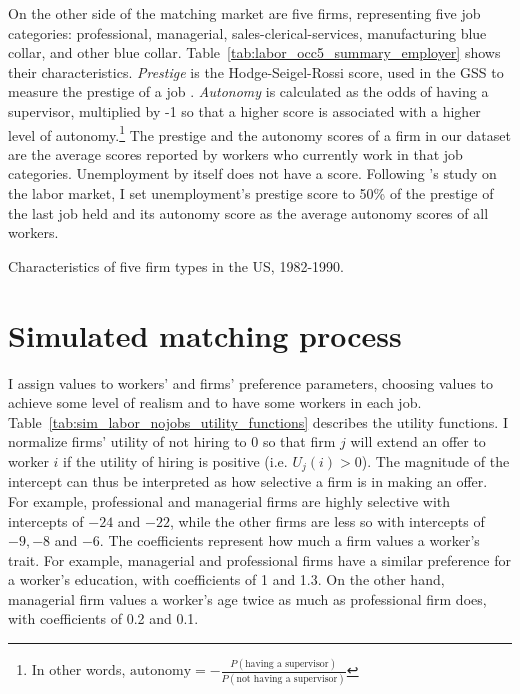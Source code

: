On the other side of the matching market are five firms, representing five job
categories: professional, managerial, sales-clerical-services, manufacturing
blue collar, and other blue collar. Table~\ref{tab:labor_occ5_summary_employer}
shows their characteristics. \textit{Prestige} is the Hodge-Seigel-Rossi score,
used in the GSS to measure the prestige of a job \citep{Hodge1964, NORC2014}.
\textit{Autonomy} is calculated as the odds of having a supervisor, multiplied
by -1 so that a higher score is associated with a higher level of
autonomy.\footnote{In other words, $\text{autonomy} = -\frac{P(\text{having a
      supervisor})}{P(\text{not having a supervisor})}$} The prestige and the
autonomy scores of a firm in our dataset are the average scores reported by
workers who currently work in that job categories. Unemployment by itself does
not have a score. Following \citet{Logan1996}'s study on the labor market, I set
unemployment's prestige score to 50\% of the prestige of the last job held and
its autonomy score as the average autonomy scores of all workers.

\begin{table}[tbp]
  \centering
  \caption[Characteristics of five firm types in the US,
  1982-1990.]{Characteristics of five firm types in the US, 1982-1990.}
  \label{tab:labor_occ5_summary_employer}
  
\end{table}

\section{Simulated matching process}

I assign values to workers' and firms' preference parameters, choosing values to
achieve some level of realism and to have some workers in each job.
Table~\ref{tab:sim_labor_nojobs_utility_functions} describes the utility
functions. I normalize firms' utility of not hiring to 0 so that firm $j$ will
extend an offer to worker $i$ if the utility of hiring is positive (i.e.
$U_{j}(i) > 0$). The magnitude of the intercept can thus be interpreted as how
selective a firm is in making an offer. For example, professional and managerial
firms are highly selective with intercepts of $-24$ and $-22$, while the other
firms are less so with intercepts of $-9, -8$ and $-6$. The coefficients
represent how much a firm values a worker's trait. For example, managerial and
professional firms have a similar preference for a worker's education, with
coefficients of 1 and 1.3. On the other hand, managerial firm values a worker's
age twice as much as professional firm does, with coefficients of 0.2 and 0.1.

